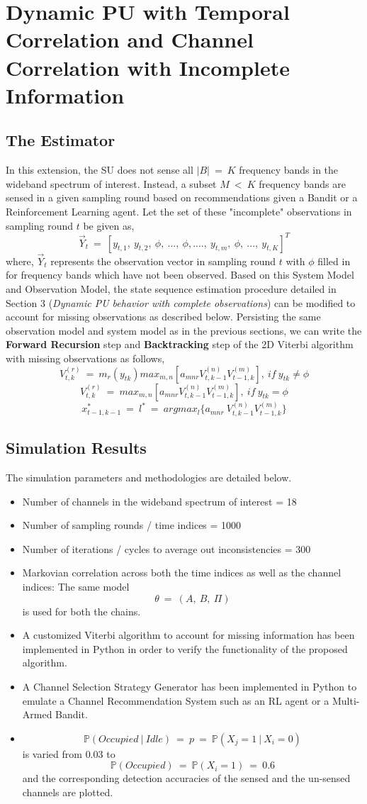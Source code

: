 \documentclass[12pt, draftcls, onecolumn]{IEEEtran}
\begin{document}
\section{Dynamic PU with Temporal Correlation and Channel Correlation with Incomplete Information}
\subsection{The Estimator}
In this extension, the SU does not sense all $|B|\ =\ K$ frequency bands in the wideband spectrum of interest. Instead, a subset $M\ <\ K$ frequency bands are sensed in a given sampling round based on recommendations given a Bandit or a Reinforcement Learning agent. Let the set of these "incomplete" observations in sampling round $t$ be given as,
\[\vec{Y}_t\ =\ [y_{t,1},\ y_{t,2},\ \phi,\ ...,\ \phi,....,\ y_{t,m},\ \phi,\ ...,\ y_{t,K}]^T\]
where, $\vec{Y}_t$ represents the observation vector in sampling round $t$ with $\phi$ filled in for frequency bands which have not been observed.
Based on this System Model and Observation Model, the state sequence estimation procedure detailed in Section 3 (\textit{Dynamic PU behavior with complete observations}) can be modified to account for missing observations as described below.
Persisting the same observation model and system model as in the previous sections, we can write the \textbf{Forward Recursion} step and \textbf{Backtracking} step of the 2D Viterbi algorithm with missing observations as follows,
\[V_{t,k}^{(r)}\ =\ m_r(y_{tk})max_{m,n}[a_{mnr}V_{t,k-1}^{(n)}V_{t-1,k}^{(m)}],\ if\ y_{tk}\neq\phi\]
\[V_{t,k}^{(r)}\ =\ max_{m,n}[a_{mnr}V_{t,k-1}^{(n)}V_{t-1,k}^{(m)}],\ if\ y_{tk}=\phi\]
\[x_{t-1,k-1}^*\ =\ l^*\ =\ argmax_{l}\{a_{mnr}\ V_{t,k-1}^{(n)}V_{t-1,k}^{(m)}\}\]
\subsection{Simulation Results}
The simulation parameters and methodologies are detailed below.
\begin{itemize}
    \item Number of channels in the wideband spectrum of interest = 18
    \item Number of sampling rounds / time indices = 1000
    \item Number of iterations / cycles to average out inconsistencies = 300
    \item Markovian correlation across both the time indices as well as the channel indices: The same model \[\theta\ =\ (A,\ B,\ \Pi)\] is used for both the chains.
    \item A customized Viterbi algorithm to account for missing information has been implemented in Python in order to verify the functionality of the proposed algorithm.
    \item A Channel Selection Strategy Generator has been implemented in Python to emulate a Channel Recommendation System such as an RL agent or a Multi-Armed Bandit.
    \item \[\mathbb P(Occupied\ |\ Idle)\ =\ p\ =\ \mathbb P(X_j=1\ |\ X_i=0)\] is varied from $0.03$ to \[\mathbb P(Occupied)\ =\ \mathbb P(X_i=1)\ =\ 0.6\] and the corresponding detection accuracies of the sensed and the un-sensed channels are plotted.
\end{itemize}
\end{document}
